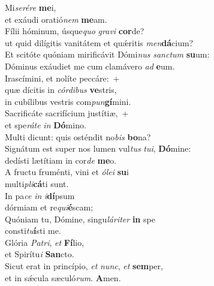 \evenverse Mi\textit{se}\textit{ré}\textit{re} \textbf{me}i,~\*\\
\evenverse et exáudi oratió\textit{nem} \textbf{me}am.\\
\oddverse Fílii hóminum, úsque\textit{quo} \textit{gra}\textit{vi} \textbf{cor}de?~\*\\
\oddverse ut quid dilígitis vanitátem et quǽritis \textit{men}\textbf{dá}cium?\\
\evenverse Et scitóte quóniam mirificávit Dómi\textit{nus} \textit{san}\textit{ctum} \textbf{su}um:~\*\\
\evenverse Dóminus exáudiet me cum clamávero \textit{ad} \textbf{e}um.\\
\oddverse Irascímini, et nolíte peccáre:~+\\
\oddverse  quæ dícitis in \textit{cór}\textit{di}\textit{bus} \textbf{ve}stris,~\*\\
\oddverse in cubílibus vestris com\textit{pun}\textbf{gí}mini.\\
\evenverse Sacrificáte sacrifícium justítiæ,~+\\
\evenverse  et spe\textit{rá}\textit{te} \textit{in} \textbf{Dó}mino.~\*\\
\evenverse Multi dicunt: quis osténdit no\textit{bis} \textbf{bo}na?\\
\oddverse Signátum est super nos lumen vul\textit{tus} \textit{tu}\textit{i}, \textbf{Dó}mine:~\*\\
\oddverse dedísti lætítiam in cor\textit{de} \textbf{me}o.\\
\evenverse A fructu fruménti, vini et \textit{ó}\textit{le}\textit{i} \textbf{su}i~\*\\
\evenverse multi\textit{pli}\textbf{cá}ti sunt.\\
\oddverse In pa\textit{ce} \textit{in} \textit{i}\textbf{dí}psum~\*\\
\oddverse dórmiam et re\textit{qui}\textbf{é}scam;\\
\evenverse Quóniam tu, Dómine, singu\textit{lá}\textit{ri}\textit{ter} \textbf{in} spe~\*\\
\evenverse consti\textit{tu}\textbf{í}sti me.\\
\oddverse Glória \textit{Pa}\textit{tri}, \textit{et} \textbf{Fí}lio,~\*\\
\oddverse et Spirítu\textit{i} \textbf{San}cto.\\
\evenverse Sicut erat in princípio, \textit{et} \textit{nunc}, \textit{et} \textbf{sem}per,~\*\\
\evenverse et in sǽcula sæculó\textit{rum}. \textbf{A}men.\\

